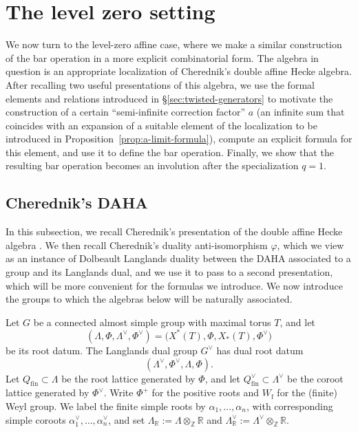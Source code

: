 \documentclass{amsart}
\theoremstyle{definition}
\numberwithin{equation}{section}
\begin{document}
\section{The level zero setting}\label{sec:level0}

We now turn to the level-zero affine case, where we make a similar construction of the bar operation in
a more explicit combinatorial form. The algebra in question is an appropriate localization of Cherednik's double affine Hecke algebra. After recalling two useful presentations of this algebra, we use the formal elements and relations introduced in \S\ref{sec:twisted-generators}
to motivate the construction of a certain ``semi-infinite
correction factor'' \(a\) (an infinite sum that coincides with an expansion of a suitable element of the localization to be introduced in Proposition~\ref{prop:a-limit-formula}), compute an explicit formula for this element, and use it to define the bar operation. Finally,
we show that the resulting bar operation becomes an involution after the
specialization \(q=1\).

\subsection{Cherednik's DAHA}

In this subsection, we recall Cherednik's presentation of the double affine
Hecke algebra \cite{Cherednik}. We then recall Cherednik's duality
anti-isomorphism $\varphi$, which we view as an instance of Dolbeault Langlands duality between the DAHA associated to a group and its Langlands dual, and we use it to pass to a second presentation, which will be more convenient
for the formulas we introduce. We now introduce the groups to which the algebras below will be naturally associated.

Let $G$ be a connected almost simple group with maximal torus $T$, and let
\[
(\Lambda,\Phi,\Lambda^\vee,\Phi^\vee)
=\bigl(X^*(T),\Phi,X_*(T),\Phi^\vee\bigr)
\]
be its root datum. The Langlands dual
group $G^\vee$ has dual root datum
\[
(\Lambda^\vee,\Phi^\vee,\Lambda,\Phi).
\]
Let \(Q_{\mathrm{fin}}\subset \Lambda\) be the root lattice generated by
\(\Phi\), and let \(Q_{\mathrm{fin}}^\vee\subset \Lambda^\vee\) be the coroot
lattice generated by \(\Phi^\vee\).
Write $\Phi^+$
for the positive roots and $W_{\mathrm f}$ for the (finite) Weyl group. We label the finite simple roots by
$\alpha_1,\dots,\alpha_n$, with corresponding simple coroots
\(\alpha_1^\vee,\ldots,\alpha_n^\vee\), and set
\(\Lambda_{\mathbb R}:=\Lambda\otimes_{\mathbb Z}\mathbb R\) and
\(\Lambda^\vee_{\mathbb R}:=\Lambda^\vee\otimes_{\mathbb Z}\mathbb R\).
\end{document}
